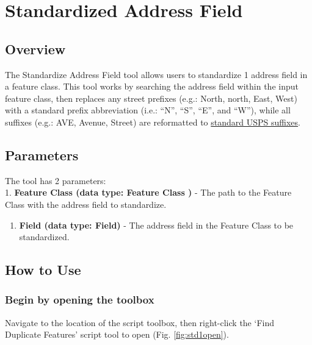 \documentclass[openany]{book}
\providecommand{\tightlist}{%
  \setlength{\itemsep}{0pt}\setlength{\parskip}{0pt}}
\theoremstyle{definition}
\theoremstyle{definition}
\theoremstyle{definition}
\theoremstyle{remark}
\begin{document}
\hypertarget{stdAdd1}{\chapter{Standardized Address
Field}\label{stdAdd1}}

\section{Overview}\label{overview-5}

The Standardize Address Field tool allows users to standardize 1 address
field in a feature class. This tool works by searching the address field
within the input feature class, then replaces any street prefixes (e.g.:
North, north, East, West) with a standard prefix abbreviation (i.e.:
``N'', ``S'', ``E'', and ``W''), while all suffixes (e.g.: AVE, Avenue,
Street) are reformatted to
\href{https://github.com/allanbreyes/udacity-data-science/blob/master/p2/data/suffixes.csv}{standard
USPS suffixes}.

\section{Parameters}\label{parameters-5}

The tool has 2 parameters:\\
1. \textbf{Feature Class (data type: Feature Class )} - The path to the
Feature Class with the address field to standardize.

\begin{enumerate}
\def\labelenumi{\arabic{enumi}.}
\setcounter{enumi}{1}
\tightlist
\item
  \textbf{Field (data type: Field)} - The address field in the Feature
  Class to be standardized.
\end{enumerate}

\section{How to Use}\label{how-to-use-5}

\subsection{Begin by opening the
toolbox}\label{begin-by-opening-the-toolbox-5}

Navigate to the location of the script toolbox, then right-click the
`Find Duplicate Features' script tool to open (Fig. \ref{fig:std1open}).
\end{document}
